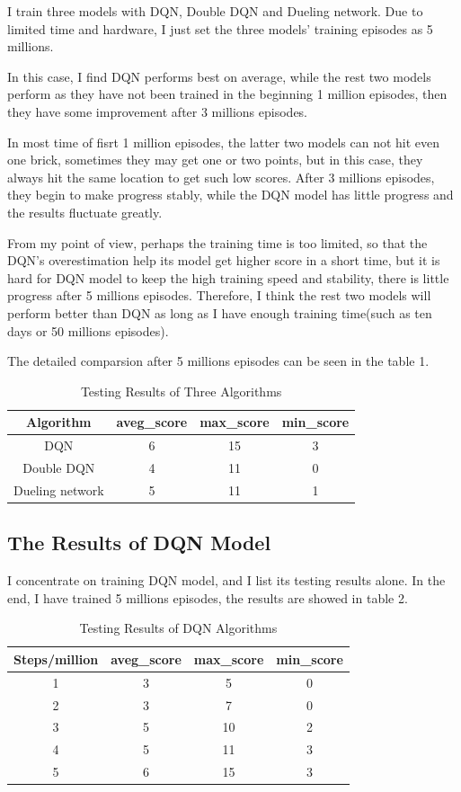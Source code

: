 \documentclass[10pt,twocolumn,letterpaper]{article}
\begin{document}
	I train three models with DQN, Double DQN and Dueling network. Due to limited time and hardware, I just set the three models' training episodes as 5 millions.
	
	In this case, I find DQN performs best on average, while the rest two models perform as they have not been trained in the beginning 1 million episodes, then they have some improvement after 3 millions episodes.
	
	In most time of fisrt 1 million episodes, the latter two models can not hit even one brick, sometimes they may get one or two points, but in this case, they always hit the same location to get such low scores. After 3 millions episodes, they begin to make progress stably, while the DQN model has little progress and the results fluctuate greatly.
	
	From my point of view, perhaps the training time is too limited, so that the DQN's overestimation help its model get higher score in a short time, but it is hard for DQN model to keep the high training speed and stability, there is little progress after 5 millions episodes. Therefore, I think the rest two models will perform better than DQN as long as I have enough training time(such as ten days or 50 millions episodes).
	
	The detailed comparsion after 5 millions episodes can be seen in the table 1.
	
	\begin{table}[!htbp]
		\centering
		\caption{Testing Results of Three Algorithms}
		\begin{tabular}{|c|c|c|c|}
			\hline
			Algorithm & aveg\_score & max\_score & min\_score
			\\
			\hline
			DQN & 6 & 15 & 3
			\\
			\hline
			Double DQN & 4 & 11 & 0
			\\
			\hline
			Dueling network & 5 & 11 & 1
			\\
			\hline
		\end{tabular}
	\end{table}
	
\subsection{The Results of DQN Model}
	I concentrate on training DQN model, and I list its testing results alone. In the end, I have trained 5 millions episodes, the results are showed in table 2.
	
	\begin{table}
		\centering
		\caption{Testing Results of DQN Algorithms}
		\begin{tabular}{|c|c|c|c|}
			\hline
			Steps/million & aveg\_score & max\_score & min\_score
			\\
			\hline
			1 & 3 & 5 & 0
			\\
			\hline
			2 & 3 & 7 & 0
			\\
			\hline
			3 & 5 & 10 & 2
			\\
			\hline
			4 & 5 & 11 & 3
			\\
			\hline
			5 & 6 & 15 & 3
			\\
			\hline
		\end{tabular}
	\end{table}
\end{document}
